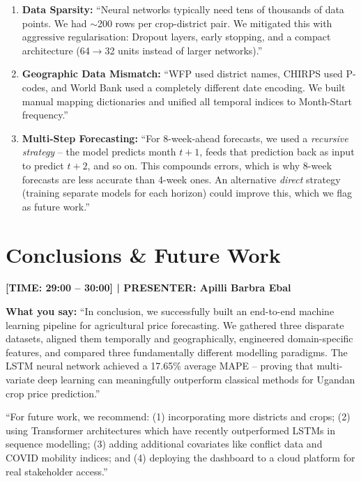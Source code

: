\documentclass[11pt,a4paper]{article}
\begin{document}
\begin{enumerate}
    \item \textbf{Data Sparsity:} ``Neural networks typically need tens of thousands of data points. We had $\sim$200 rows per crop-district pair. We mitigated this with aggressive regularisation: Dropout layers, early stopping, and a compact architecture (64$\rightarrow$32 units instead of larger networks).''
    
    \item \textbf{Geographic Data Mismatch:} ``WFP used district names, CHIRPS used P-codes, and World Bank used a completely different date encoding. We built manual mapping dictionaries and unified all temporal indices to Month-Start frequency.''
    
    \item \textbf{Multi-Step Forecasting:} ``For 8-week-ahead forecasts, we used a \textit{recursive strategy} -- the model predicts month $t+1$, feeds that prediction back as input to predict $t+2$, and so on. This compounds errors, which is why 8-week forecasts are less accurate than 4-week ones. An alternative \textit{direct} strategy (training separate models for each horizon) could improve this, which we flag as future work.''
\end{enumerate}

\section{Conclusions \& Future Work}
\textcolor{timecolor}{\textbf{[TIME: 29:00 -- 30:00] | PRESENTER: Apilli Barbra Ebal}}

\textbf{What you say:}
``In conclusion, we successfully built an end-to-end machine learning pipeline for agricultural price forecasting. We gathered three disparate datasets, aligned them temporally and geographically, engineered domain-specific features, and compared three fundamentally different modelling paradigms. The LSTM neural network achieved a 17.65\% average MAPE -- proving that multi-variate deep learning can meaningfully outperform classical methods for Ugandan crop price prediction.''

``For future work, we recommend: (1) incorporating more districts and crops; (2) using Transformer architectures which have recently outperformed LSTMs in sequence modelling; (3) adding additional covariates like conflict data and COVID mobility indices; and (4) deploying the dashboard to a cloud platform for real stakeholder access.''
\end{document}
